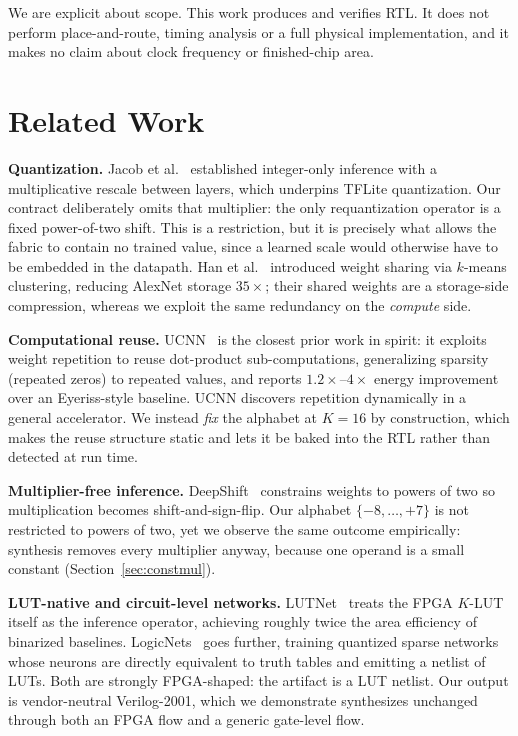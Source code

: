 \documentclass[conference]{IEEEtran}
\begin{document}
We are explicit about scope. This work produces and verifies RTL. It does not
perform place-and-route, timing analysis or a full physical implementation, and
it makes no claim about clock frequency or finished-chip area.

\section{Related Work}

\textbf{Quantization.} Jacob et al.~\cite{jacob} established integer-only
inference with a multiplicative rescale between layers, which underpins TFLite
quantization. Our contract deliberately omits that multiplier: the only
requantization operator is a fixed power-of-two shift. This is a restriction,
but it is precisely what allows the fabric to contain no trained value, since a
learned scale would otherwise have to be embedded in the datapath.
Han et al.~\cite{deepcompression} introduced weight sharing via $k$-means
clustering, reducing AlexNet storage $35\times$; their shared weights are a
storage-side compression, whereas we exploit the same redundancy on the
\emph{compute} side.

\textbf{Computational reuse.} UCNN~\cite{ucnn} is the closest prior work in
spirit: it exploits weight repetition to reuse dot-product sub-computations,
generalizing sparsity (repeated zeros) to repeated values, and reports
$1.2\times$--$4\times$ energy improvement over an Eyeriss-style baseline. UCNN
discovers repetition dynamically in a general accelerator. We instead
\emph{fix} the alphabet at $K{=}16$ by construction, which makes the reuse
structure static and lets it be baked into the RTL rather than detected at run
time.

\textbf{Multiplier-free inference.} DeepShift~\cite{deepshift} constrains
weights to powers of two so multiplication becomes shift-and-sign-flip.
Our alphabet $\{-8,\dots,+7\}$ is not restricted to powers of two, yet we
observe the same outcome empirically: synthesis removes every multiplier
anyway, because one operand is a small constant (Section~\ref{sec:constmul}).

\textbf{LUT-native and circuit-level networks.} LUTNet~\cite{lutnet} treats the
FPGA $K$-LUT itself as the inference operator, achieving roughly twice the area
efficiency of binarized baselines. LogicNets~\cite{logicnets} goes further,
training quantized sparse networks whose neurons are directly equivalent to
truth tables and emitting a netlist of LUTs. Both are strongly FPGA-shaped: the
artifact is a LUT netlist. Our output is vendor-neutral Verilog-2001, which we
demonstrate synthesizes unchanged through both an FPGA flow and a generic
gate-level flow.
\end{document}
